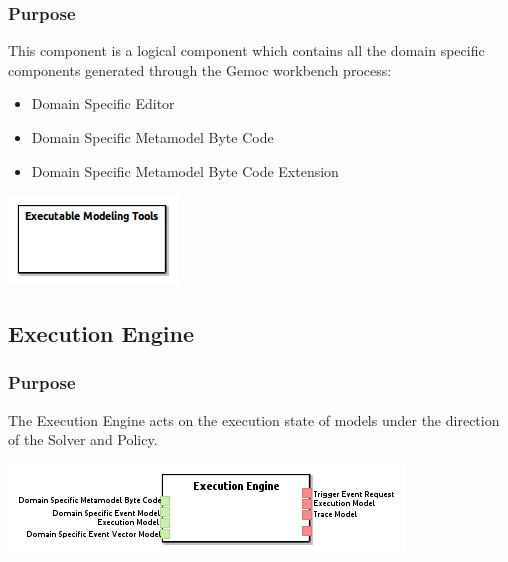 \documentclass{gemoc} %
\begin{document}

\subsubsection{Purpose}
This component is a logical component which contains all the domain specific components generated through the Gemoc workbench process:  
\begin{itemize}
\item Domain Specific Editor
\item Domain Specific Metamodel Byte Code
\item Domain Specific Metamodel Byte Code Extension
\end{itemize}

\begin{center}
\includegraphics*[trim=0.0cm 0.0cm 0cm 0.0cm, clip=true]{../images/generated/Generated_Executable_Modeling_Tools.png}
\end{center}




\subsection{Execution Engine}


\subsubsection{Purpose}
The Execution Engine acts on the execution state of models under the direction of the Solver and Policy.

\begin{center}
\includegraphics*[trim=0.0cm 0.0cm 0cm 0.0cm, clip=true]{../images/generated/Generated_Execution_Engine.png}
\end{center}
\end{document}
